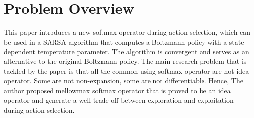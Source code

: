 \section{Problem Overview}
\label{section:intro}
This paper introduces a new softmax operator during action selection, which can be used in a SARSA algorithm that computes a Boltzmann policy with a state-dependent temperature parameter. The algorithm is convergent and serves as an alternative to the original Boltzmann policy. The main research problem that is tackled by the paper is that all the common using softmax operator are not idea operator. Some are not non-expansion, some are not differentiable. Hence, The author proposed mellowmax softmax operator that is proved to be an idea operator and generate a well trade-off between exploration and exploitation during action selection.
